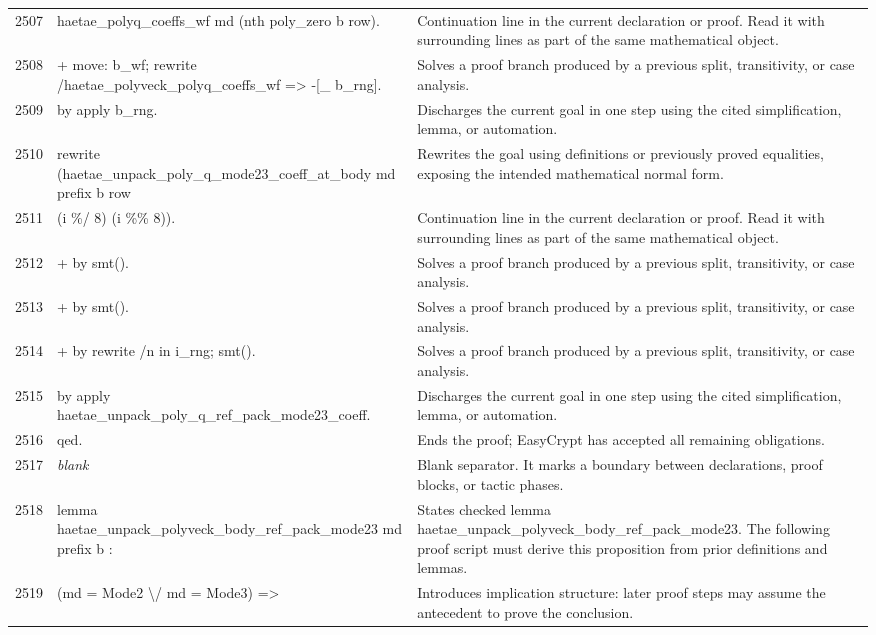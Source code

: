 \documentclass[10pt]{article}
\begin{document}
\begin{longtable}{r L{0.53\textwidth} L{0.37\textwidth}}
2507 & {\ttfamily\scriptsize   haetae\_polyq\_coeffs\_wf md (nth poly\_zero b row).} & Continuation line in the current declaration or proof.  Read it with surrounding lines as part of the same mathematical object. \\
2508 & {\ttfamily\scriptsize + move: b\_wf; rewrite /haetae\_polyveck\_polyq\_coeffs\_wf => -[\_ b\_rng].} & Solves a proof branch produced by a previous split, transitivity, or case analysis. \\
2509 & {\ttfamily\scriptsize   by apply b\_rng.} & Discharges the current goal in one step using the cited simplification, lemma, or automation. \\
2510 & {\ttfamily\scriptsize rewrite (haetae\_unpack\_poly\_q\_mode23\_coeff\_at\_body md prefix b row} & Rewrites the goal using definitions or previously proved equalities, exposing the intended mathematical normal form. \\
2511 & {\ttfamily\scriptsize            (i \%/ 8) (i \%\% 8)).} & Continuation line in the current declaration or proof.  Read it with surrounding lines as part of the same mathematical object. \\
2512 & {\ttfamily\scriptsize + by smt().} & Solves a proof branch produced by a previous split, transitivity, or case analysis. \\
2513 & {\ttfamily\scriptsize + by smt().} & Solves a proof branch produced by a previous split, transitivity, or case analysis. \\
2514 & {\ttfamily\scriptsize + by rewrite /n in i\_rng; smt().} & Solves a proof branch produced by a previous split, transitivity, or case analysis. \\
2515 & {\ttfamily\scriptsize by apply haetae\_unpack\_poly\_q\_ref\_pack\_mode23\_coeff.} & Discharges the current goal in one step using the cited simplification, lemma, or automation. \\
2516 & {\ttfamily\scriptsize qed.} & Ends the proof; EasyCrypt has accepted all remaining obligations. \\
2517 & {\ttfamily\scriptsize \emph{blank}} & Blank separator.  It marks a boundary between declarations, proof blocks, or tactic phases. \\
2518 & {\ttfamily\scriptsize lemma haetae\_unpack\_polyveck\_body\_ref\_pack\_mode23 md prefix b :} & States checked lemma haetae\_unpack\_polyveck\_body\_ref\_pack\_mode23.  The following proof script must derive this proposition from prior definitions and lemmas. \\
2519 & {\ttfamily\scriptsize   (md = Mode2 \textbackslash{}/ md = Mode3) =>} & Introduces implication structure: later proof steps may assume the antecedent to prove the conclusion. \\

\end{longtable}
\end{document}
